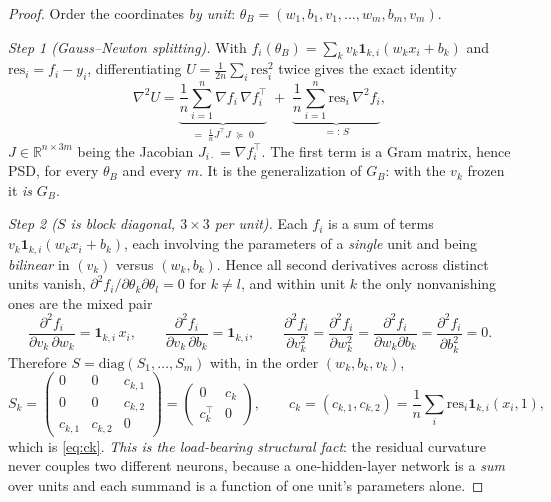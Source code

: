 \documentclass[11pt]{article}
\theoremstyle{remark}
\newcommand{\R}{\mathbb{R}}
\newcommand{\res}{\mathrm{res}}
\begin{document}
\begin{proof}
Order the coordinates \emph{by unit}: $\theta_B=(w_1,b_1,v_1,\dots,w_m,b_m,v_m)$.

\smallskip
\emph{Step 1 (Gauss--Newton splitting).} With
$f_i(\theta_B)=\sum_kv_k\mathbf1_{k,i}(w_kx_i+b_k)$ and
$\res_i=f_i-y_i$, differentiating $U=\frac1{2n}\sum_i\res_i^2$ twice gives the
exact identity
\begin{equation}\label{eq:GNsplit}
\nabla^2U
=\underbrace{\frac1n\sum_{i=1}^n\nabla f_i\,\nabla f_i^{\top}}_{=\;\frac1nJ^\top J\;\succeq\;0}
\;+\;\underbrace{\frac1n\sum_{i=1}^n \res_i\,\nabla^2f_i}_{=:\,S},
\end{equation}
$J\in\R^{n\times3m}$ being the Jacobian $J_{i\cdot}=\nabla f_i^\top$. The first
term is a Gram matrix, hence PSD, for every $\theta_B$ and every $m$. It is the
generalization of $G_B$: with the $v_k$ frozen it \emph{is} $G_B$.

\smallskip
\emph{Step 2 ($S$ is block diagonal, $3\times3$ per unit).} Each $f_i$ is a sum
of terms $v_k\mathbf1_{k,i}(w_kx_i+b_k)$, each involving the parameters of a
\emph{single} unit and being \emph{bilinear} in $(v_k)$ versus $(w_k,b_k)$.
Hence all second derivatives across distinct units vanish,
$\partial^2f_i/\partial\theta_k\partial\theta_l=0$ for $k\ne l$, and within
unit $k$ the only nonvanishing ones are the mixed pair
\[
\frac{\partial^2f_i}{\partial v_k\,\partial w_k}=\mathbf1_{k,i}\,x_i,
\qquad
\frac{\partial^2f_i}{\partial v_k\,\partial b_k}=\mathbf1_{k,i},
\qquad
\frac{\partial^2f_i}{\partial v_k^2}
=\frac{\partial^2f_i}{\partial w_k^2}
=\frac{\partial^2f_i}{\partial w_k\partial b_k}
=\frac{\partial^2f_i}{\partial b_k^2}=0 .
\]
Therefore $S=\mathrm{diag}(S_1,\dots,S_m)$ with, in the order $(w_k,b_k,v_k)$,
\begin{equation}\label{eq:Sk}
S_k=\begin{pmatrix}0&0&c_{k,1}\\ 0&0&c_{k,2}\\ c_{k,1}&c_{k,2}&0\end{pmatrix}
=\begin{pmatrix}0&c_k\\ c_k^\top&0\end{pmatrix},
\qquad c_k=(c_{k,1},c_{k,2})=\frac1n\sum_i\res_i\mathbf1_{k,i}(x_i,1),
\end{equation}
which is \eqref{eq:ck}. \emph{This is the load-bearing structural fact}: the
residual curvature never couples two different neurons, because a one-hidden-layer
network is a \emph{sum} over units and each summand is a function of one unit's
parameters alone.


\end{proof}
\end{document}
